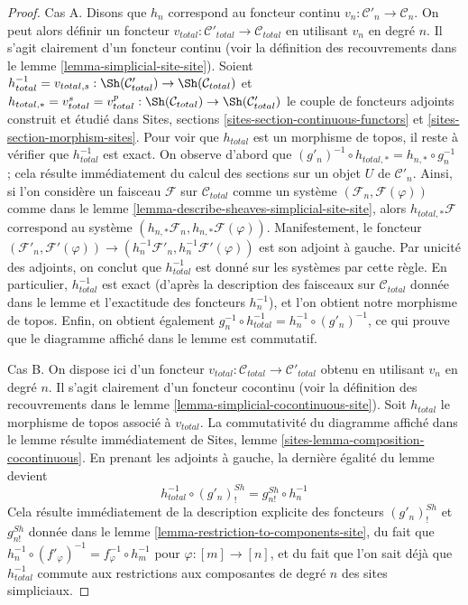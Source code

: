 \begin{proof}
Cas A. Disons que $h_n$ correspond au foncteur continu
$v_n : \mathcal{C}'_n \to \mathcal{C}_n$. On peut alors définir
un foncteur $v_{total} : \mathcal{C}'_{total} \to \mathcal{C}_{total}$
en utilisant $v_n$ en degré $n$. Il s'agit clairement d'un foncteur continu
(voir la définition des recouvrements dans le lemme \ref{lemma-simplicial-site-site}).
Soient
$h_{total}^{-1} = v_{total, s} :
\Sh(\mathcal{C}'_{total}) \to \Sh(\mathcal{C}_{total})$ et
$h_{total, *} = v_{total}^s = v_{total}^p :
\Sh(\mathcal{C}_{total}) \to \Sh(\mathcal{C}'_{total})$
le couple de foncteurs adjoints construit et étudié dans
Sites, sections \ref{sites-section-continuous-functors} et
\ref{sites-section-morphism-sites}.
Pour voir que $h_{total}$ est un morphisme de topos,
il reste à vérifier que $h_{total}^{-1}$ est exact.
On observe d'abord que
$(g'_n)^{-1} \circ h_{total, *} = h_{n, *} \circ g_n^{-1}$ ;
cela résulte immédiatement du calcul des sections sur un objet $U$
de $\mathcal{C}'_n$. Ainsi, si l'on considère un faisceau $\mathcal{F}$
sur $\mathcal{C}_{total}$ comme un système $(\mathcal{F}_n, \mathcal{F}(\varphi))$
comme dans le lemme \ref{lemma-describe-sheaves-simplicial-site-site}, alors
$h_{total, *}\mathcal{F}$ correspond
au système $(h_{n, *}\mathcal{F}_n, h_{n, *}\mathcal{F}(\varphi))$.
Manifestement, le foncteur
$(\mathcal{F}'_n, \mathcal{F}'(\varphi)) \to
(h_n^{-1}\mathcal{F}'_n, h_n^{-1}\mathcal{F}'(\varphi))$
est son adjoint à gauche. Par unicité des adjoints, on conclut que
$h_{total}^{-1}$ est donné sur les systèmes par cette règle. En particulier,
$h_{total}^{-1}$ est exact (d'après la description des faisceaux sur
$\mathcal{C}_{total}$ donnée dans le lemme et l'exactitude des
foncteurs $h_n^{-1}$), et l'on obtient notre morphisme de topos.
Enfin, on obtient également $g_n^{-1} \circ h_{total}^{-1} =
h_n^{-1} \circ (g'_n)^{-1}$, ce qui prouve que le
diagramme affiché dans le lemme est commutatif.

\medskip\noindent
Cas B. On dispose ici d'un foncteur
$v_{total} : \mathcal{C}_{total} \to \mathcal{C}'_{total}$
obtenu en utilisant $v_n$ en degré $n$. Il s'agit clairement d'un foncteur cocontinu
(voir la définition des recouvrements dans le lemme \ref{lemma-simplicial-cocontinuous-site}).
Soit $h_{total}$ le morphisme de topos associé à $v_{total}$.
La commutativité du diagramme affiché dans le lemme résulte
immédiatement de Sites, lemme \ref{sites-lemma-composition-cocontinuous}.
En prenant les adjoints à gauche, la dernière égalité du lemme devient
$$
h_{total}^{-1} \circ (g'_n)^{Sh}_! = g^{Sh}_{n!} \circ h_n^{-1}
$$
Cela résulte immédiatement de la description explicite des foncteurs
$(g'_n)^{Sh}_!$ et $g^{Sh}_{n!}$ donnée dans le
lemme \ref{lemma-restriction-to-components-site},
du fait que $h_n^{-1} \circ (f'_\varphi)^{-1} =
f_\varphi^{-1} \circ h_m^{-1}$ pour $\varphi : [m] \to [n]$, et
du fait que l'on sait déjà que $h_{total}^{-1}$ commute
aux restrictions aux composantes de degré $n$ des sites simpliciaux.
\end{proof}

